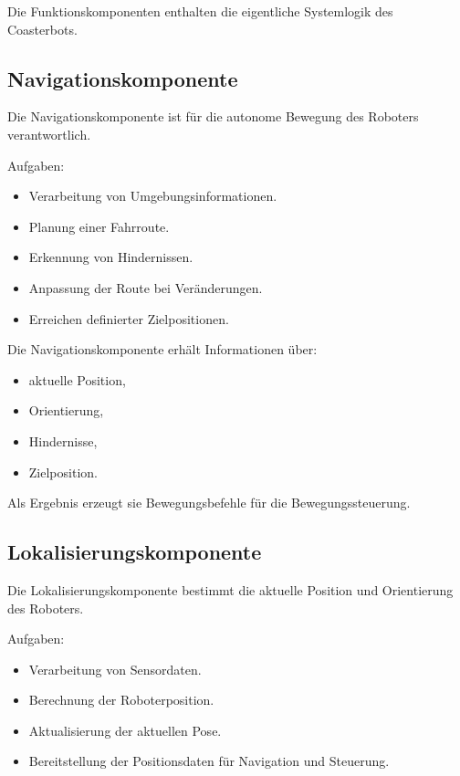 Die Funktionskomponenten enthalten die eigentliche Systemlogik des
Coasterbots.

\subsection{Navigationskomponente}\label{navigationskomponente-1}

Die Navigationskomponente ist für die autonome Bewegung des Roboters
verantwortlich.

Aufgaben:

\begin{itemize}
\tightlist
\item
  Verarbeitung von Umgebungsinformationen.
\item
  Planung einer Fahrroute.
\item
  Erkennung von Hindernissen.
\item
  Anpassung der Route bei Veränderungen.
\item
  Erreichen definierter Zielpositionen.
\end{itemize}

Die Navigationskomponente erhält Informationen über:

\begin{itemize}
\tightlist
\item
  aktuelle Position,
\item
  Orientierung,
\item
  Hindernisse,
\item
  Zielposition.
\end{itemize}

Als Ergebnis erzeugt sie Bewegungsbefehle für die Bewegungssteuerung.

\subsection{Lokalisierungskomponente}\label{lokalisierungskomponente-1}

Die Lokalisierungskomponente bestimmt die aktuelle Position und
Orientierung des Roboters.

Aufgaben:

\begin{itemize}
\tightlist
\item
  Verarbeitung von Sensordaten.
\item
  Berechnung der Roboterposition.
\item
  Aktualisierung der aktuellen Pose.
\item
  Bereitstellung der Positionsdaten für Navigation und Steuerung.
\end{itemize}

